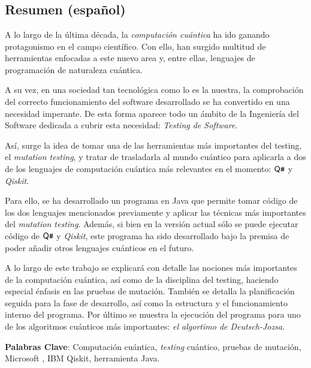 \chapter*{}

\section*{Resumen (español)}
A lo largo de la última década, la \emph{computación cuántica} ha ido ganando protagonismo en el campo científico. Con ello, han surgido multitud de herramientas enfocadas a este nuevo area y,  entre ellas, lenguajes de programación de naturaleza cuántica.

A su vez, en una sociedad tan tecnológica como lo es la nuestra, la comprobación del correcto funcionamiento del software desarrollado se ha convertido en una necesidad imperante. De esta forma aparece todo un ámbito de la Ingeniería del Software dedicada a cubrir esta necesidad: \emph{Testing de Software}.

Así, surge la idea de tomar una de las herramientas más importantes del testing, el \textit{mutation testing}, y tratar de trasladarla al mundo cuántico para aplicarla a dos de los lenguajes de computación cuántica más relevantes en el momento: $\textsf{Q}\texttt{\#}$  y \textit{Qiskit}.

Para ello, se ha desarrollado un programa en Java que permite tomar código de los dos lenguajes mencionados previamente y aplicar las técnicas más importantes del \textit{mutation testing}. Además, si bien en la versión actual sólo se puede ejecutar código de $\textsf{Q}\texttt{\#}$ y \textit{Qiskit}, este programa ha sido desarrollado bajo la premisa de poder añadir otros lenguajes cuánticos en el futuro.

A lo largo de este trabajo se explicará con detalle las nociones más importantes de la computación cuántica, así como de la disciplina del testing, haciendo especial énfasis en las pruebas de mutación. También se detalla la planificación seguida para la fase de desarrollo, así como la estructura y el funcionamiento interno del programa. Por último se muestra la ejecución del programa para uno de los algoritmos cuánticos más importantes: \textit{el algortimo de Deutsch-Jozsa.}

\textbf{Palabras Clave}: Computación cuántica, \textit{testing} cuántico, pruebas de mutación, Microsoft \qsh, IBM Qiskit, herramienta Java.

